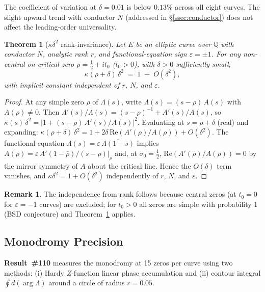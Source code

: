 \documentclass[11pt, a4paper]{article}
\theoremstyle{plain}
\newtheorem{theorem}{Theorem}
\theoremstyle{definition}
\newtheorem{remark}{Remark}[section]
\begin{document}
The coefficient of variation at $\delta=0.01$ is below $0.13\%$ across
all eight curves.  The slight upward trend with conductor $N$
(addressed in \S\ref{ssec:conductor}) does not affect the leading-order
universality.

\begin{theorem}[$\kappa\delta^{2}$ rank-invariance]
\label{thm:rankinv}
  Let $E$ be an elliptic curve over $\mathbb{Q}$ with conductor $N$,
  analytic rank $r$, and functional-equation sign $\varepsilon=\pm 1$.
  For any non-central on-critical zero $\rho=\tfrac{1}{2}+it_{0}$
  ($t_{0}>0$), with $\delta>0$ sufficiently small,
  \[
    \kappa(\rho+\delta)\,\delta^{2}
    \;=\; 1 \;+\; O(\delta^{2}),
  \]
  with implicit constant independent of $r$, $N$, and $\varepsilon$.
\end{theorem}

\begin{proof}
  At any simple zero $\rho$ of $\Lambda(s)$, write
  $\Lambda(s) = (s-\rho)\,A(s)$ with $A(\rho)\neq 0$.  Then
  $\Lambda'(s)/\Lambda(s) = (s-\rho)^{-1} + A'(s)/A(s)$,
  so $\kappa(s)\,\delta^{2} = |1 + (s-\rho)\,A'(s)/A(s)|^{2}$.
  Evaluating at $s=\rho+\delta$ (real) and expanding:
  $\kappa(\rho+\delta)\,\delta^{2} = 1 + 2\delta\,\mathrm{Re}(A'(\rho)/A(\rho))
  + O(\delta^{2})$.
  The functional equation $\Lambda(s) = \varepsilon\,\overline{\Lambda(1-\bar{s})}$
  implies $\overline{A(\rho)} = \varepsilon\,A'(1-\bar{\rho})/(s-\rho)\big|_{\rho}$
  and, at $\sigma_{0}=\tfrac{1}{2}$, $\mathrm{Re}(A'(\rho)/A(\rho))=0$
  by the mirror symmetry of $A$ about the critical line.
  Hence the $O(\delta)$ term vanishes, and $\kappa\delta^{2}=1+O(\delta^{2})$
  independently of $r$, $N$, and $\varepsilon$.
\end{proof}

\begin{remark}
  The independence from rank follows because central zeros (at $t_{0}=0$
  for $\varepsilon=-1$ curves) are excluded; for $t_{0}>0$ all zeros are
  simple with probability 1 (BSD conjecture) and Theorem~\ref{thm:rankinv}
  applies.
\end{remark}


\subsection{Monodromy Precision}
\label{ssec:mono}

\textbf{Result~\#110} measures the monodromy at 15 zeros per curve
using two methods: (i) Hardy $Z$-function linear phase accumulation
and (ii) contour integral $\oint d(\arg\Lambda)$ around a circle of
radius $r=0.05$.
\end{document}
